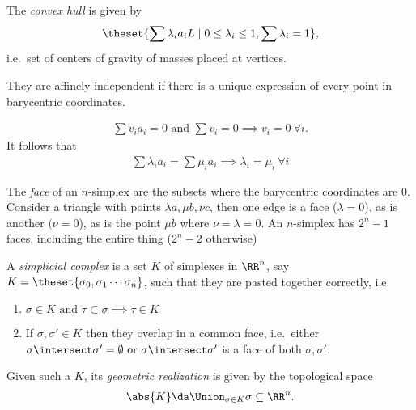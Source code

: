 The \emph{convex hull} is given by
\begin{align*}
\theset{\sum \lambda_i a_iL \mid 0 \leq \lambda_i \leq 1, \sum \lambda_i = 1}
,\end{align*} i.e.~set of centers of gravity of masses placed at
vertices.

They are affinely independent if there is a unique expression of every
point in barycentric coordinates.

\begin{align*}
\sum v_i a_i = 0 \text{ and } \sum v_i = 0 \implies v_i = 0 ~\forall i
.\end{align*} It follows that
\begin{align*}
\sum \lambda_i a_i = \sum \mu_i a_i
\implies
\lambda_i = \mu_i ~\forall i
\end{align*}

The \emph{face} of an \(n\)-simplex are the subsets where the
barycentric coordinates are 0. Consider a triangle with points
\(\lambda a, \mu b, \nu c\), then one edge is a face (\(\lambda=0\)), as
is another \((\nu = 0\)), as is the point \(\mu b\) where
\(\nu = \lambda = 0\). An \(n\)-simplex has \(2^n - 1\) faces, including
the entire thing (\(2^n - 2\) otherwise)

\begin{definition}

A \emph{simplicial complex} is a set \(K\) of simplexes in \(\RR^n\),
say \(K = \theset{\sigma_0, \sigma_1 \cdots \sigma_n}\), such that they
are pasted together correctly, i.e.

\begin{enumerate}
\def\labelenumi{\arabic{enumi}.}
\tightlist
\item
  \(\sigma \in K \text{ and } \tau \subset \sigma \implies \tau \in K\)
\item
  If \(\sigma, \sigma' \in K\) then they overlap in a common face,
  i.e.~either
  \(\sigma \intersect \sigma' = \emptyset \text{ or } \sigma\intersect\sigma'\)
  is a face of both \(\sigma,\sigma'\).
\end{enumerate}

\end{definition}

\begin{definition}

Given such a \(K\), its \emph{geometric realization} is given by the
topological space
\begin{align*}
\abs{K} \da \Union_{\sigma\in K} \sigma \subseteq \RR^n
.\end{align*}

\end{definition}

